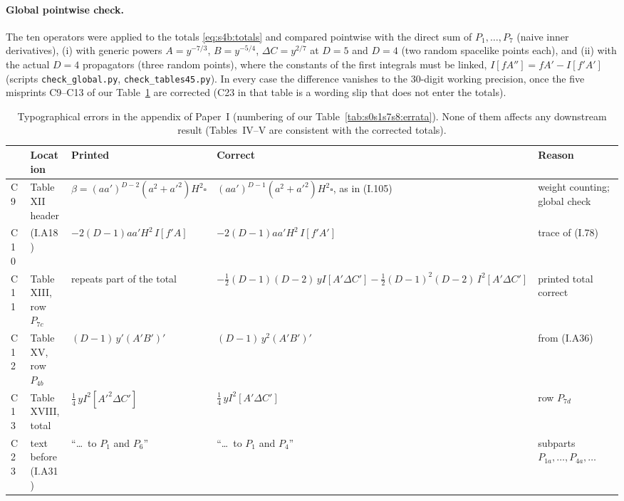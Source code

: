 \documentclass[aps,prd,onecolumn,10pt,nofootinbib,floatfix]{revtex4-2}
\newcommand{\PI}{Paper~I}
\newcommand{\eqI}[1]{(I.#1)}
\begin{document}
\paragraph*{Global pointwise check.}
The ten operators were applied to the totals \eqref{eq:s4b:totals} and compared pointwise with the direct sum of
$P_1,\dots,P_7$ (naive inner derivatives), (i) with generic powers $A=y^{-7/3}$, $B=y^{-5/4}$, $\Delta C=y^{2/7}$ at
$D=5$ and $D=4$ (two random spacelike points each), and (ii) with the actual $D=4$ propagators (three random points),
where the constants of the first integrals must be linked, $I[fA'']=fA'-I[f'A']$ (scripts \texttt{check\_global.py},
\texttt{check\_tables45.py}). In every case the difference vanishes to the 30-digit working precision, once the five
misprints C9--C13 of our Table~\ref{tab:s4b:apptypos} are corrected (C23 in that table is a wording slip that does not enter the
totals).

\begin{table}[tb]
\caption{Typographical errors in the appendix of \PI{} (numbering of our Table~\ref{tab:s0s1s7s8:errata}). None of them affects any
downstream result (Tables~IV--V are consistent with the corrected totals).}
\label{tab:s4b:apptypos}
\renewcommand{\arraystretch}{1.3}
\begin{ruledtabular}
\begin{tabular}{@{}l>{\raggedright\arraybackslash}p{}>{\raggedright\arraybackslash}p{}%
>{\raggedright\arraybackslash}p{}>{\raggedright\arraybackslash}p{}@{}}
& Location & Printed & Correct & Reason\\
\hline
C9 & Table XII header & $\beta=(aa')^{D-2}(a^2+a'^2)H^2\square$ & $(aa')^{D-1}(a^2+a'^2)H^2\square$, as in \eqI{105} & weight counting; global check\\
C10 & \eqI{A18} & $-2(D-1)aa'H^2\,I[f'A]$ & $-2(D-1)aa'H^2\,I[f'A']$ & trace of \eqI{78}\\
C11 & Table XIII, row $P_{7c}$ & repeats part of the total & $-\frac12(D-1)(D-2)\,yI[A'\Delta C']-\frac12(D-1)^2(D-2)\,I^2[A'\Delta C']$ & printed total correct\\
C12 & Table XV, row $P_{4b}$ & $(D-1)\,y'(A'B')'$ & $(D-1)\,y^2(A'B')'$ & from \eqI{A36}\\
C13 & Table XVIII, total & $\frac14\,yI^2[A'^2\Delta C']$ & $\frac14\,yI^2[A'\Delta C']$ & row $P_{7d}$\\
C23 & text before \eqI{A31} & ``\ldots\ to $P_1$ and $P_6$'' & ``\ldots\ to $P_1$ and $P_4$'' & subparts $P_{1a},\dots,P_{4a},\dots$\\
\end{tabular}
\end{ruledtabular}
\end{table}
\end{document}
